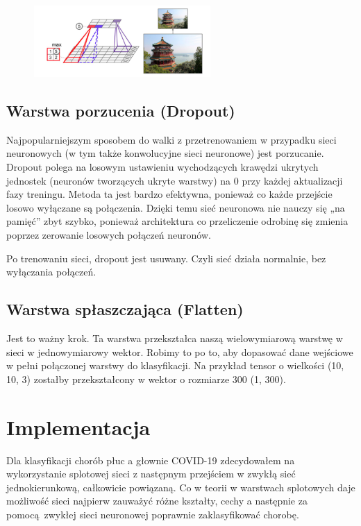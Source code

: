 \documentclass{article}
\begin{document}
\begin{figure}[H]
	\centering
	\includegraphics[width=0.6\textwidth,keepaspectratio=true]{max_pooling}
	\caption{}
	\label{max_pooling}
\end{figure}


\subsection{Warstwa porzucenia (Dropout)}
Najpopularniejszym sposobem do walki z przetrenowaniem w przypadku sieci neuronowych (w tym także konwolucyjne sieci neuronowe) jest porzucanie. Dropout polega na losowym ustawieniu wychodzących krawędzi ukrytych jednostek (neuronów tworzących ukryte warstwy) na 0 przy każdej aktualizacji fazy treningu. Metoda ta jest bardzo efektywna, ponieważ co każde przejście losowo wyłączane są połączenia. Dzięki temu sieć neuronowa nie nauczy się „na pamięć” zbyt szybko, ponieważ architektura co przeliczenie odrobinę się zmienia poprzez zerowanie losowych połączeń neuronów. \cite{jak_dziawaja_cnn}

Po trenowaniu sieci, dropout jest usuwany. Czyli sieć działa normalnie, bez wyłączania połączeń.


\subsection{Warstwa spłaszczająca (Flatten)}
Jest to ważny krok. Ta warstwa przekształca naszą wielowymiarową warstwę w sieci w jednowymiarowy wektor. Robimy to po to, aby dopasować dane wejściowe w pełni połączonej warstwy do klasyfikacji. Na przykład tensor o wielkości (10, 10, 3) zostałby przekształcony w wektor o rozmiarze 300 (1, 300). \cite{jak_dziawaja_cnn}

\section{Implementacja}
Dla klasyfikacji chorób płuc a głownie COVID-19 zdecydowałem na wykorzystanie splotowej sieci z następnym przejściem w zwykłą sieć jednokierunkową, całkowicie powiązaną. Co w teorii w warstwach splotowych daje możliwość sieci najpierw zauważyć różne kształty, cechy a następnie za pomocą zwykłej sieci neuronowej poprawnie zaklasyfikować chorobę.
\end{document}
